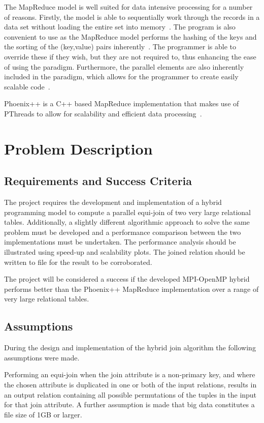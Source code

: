 \documentclass[10pt,twocolumn]{witseiepaper}
\begin{document}
The MapReduce model is well suited for data intensive processing for a number of reasons. Firstly, the model is able to sequentially work through the records in a data set without loading the entire set into memory~\cite{comparingMPIMapReduce}. The program is also convenient to use as the MapReduce model performs the hashing of the keys and the sorting of the (key,value) pairs inherently~\cite{phoenix}. The programmer is able to override these if they wish, but they are not required to, thus enhancing the ease of using the paradigm. Furthermore, the parallel elements are also inherently included in the paradigm, which allows for the programmer to create easily scalable code~\cite{comparingMPIMapReduce}. 

Phoenix++ is a C++ based MapReduce implementation that makes use of PThreads to allow for scalability and efficient data processing~\cite{phoenix}.

\section{Problem Description}

\subsection{Requirements and Success Criteria}

The project requires the development and implementation of a hybrid programming model to compute a parallel equi-join of two very large relational tables. Additionally, a slightly different algorithmic approach to solve the same problem must be developed and a performance comparison between the two implementations must be undertaken. The performance analysis should be illustrated using speed-up and scalability plots. The joined relation should be written to file for the result to be corroborated.

The project will be considered a success if the developed MPI-OpenMP hybrid performs better than the Phoenix++ MapReduce implementation over a range of very large relational tables. 

\subsection{Assumptions}

During the design and implementation of the hybrid join algorithm the following assumptions were made.  

Performing an equi-join when the join attribute is a non-primary key, and where the chosen attribute is duplicated in one or both of the input relations, results in an output relation containing all possible permutations of the tuples in the input for that join attribute. A further assumption is made that big data constitutes a file size of 1GB or larger. 
\end{document}
